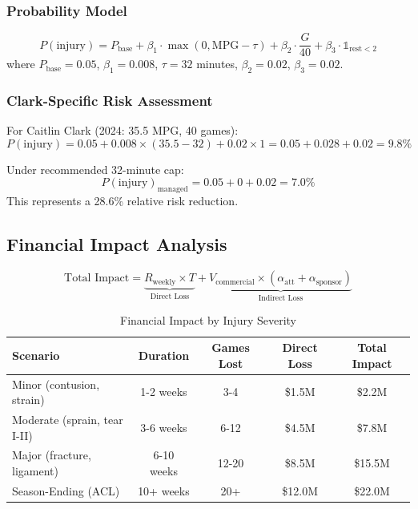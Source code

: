 \documentclass{mcmthesis}
\begin{document}
\subsubsection{Probability Model}

\begin{equation}
P(\text{injury}) = P_{\text{base}} + \beta_1 \cdot \max(0, \text{MPG} - \tau) + \beta_2 \cdot \frac{G}{40} + \beta_3 \cdot \mathbb{1}_{\text{rest} < 2}
\end{equation}
where $P_{\text{base}} = 0.05$, $\beta_1 = 0.008$, $\tau = 32$ minutes, $\beta_2 = 0.02$, $\beta_3 = 0.02$.

\subsubsection{Clark-Specific Risk Assessment}

For Caitlin Clark (2024: 35.5 MPG, 40 games):
\begin{equation}
P(\text{injury}) = 0.05 + 0.008 \times (35.5 - 32) + 0.02 \times 1 = 0.05 + 0.028 + 0.02 = 9.8\%
\end{equation}

Under recommended 32-minute cap:
\begin{equation}
P(\text{injury})_{\text{managed}} = 0.05 + 0 + 0.02 = 7.0\%
\end{equation}
This represents a 28.6\% relative risk reduction.

\subsection{Financial Impact Analysis}

\begin{equation}
\text{Total Impact} = \underbrace{R_{\text{weekly}} \times T}_{\text{Direct Loss}} + \underbrace{V_{\text{commercial}} \times (\alpha_{\text{att}} + \alpha_{\text{sponsor}})}_{\text{Indirect Loss}}
\end{equation}

\begin{table}[H]
\centering
\caption{Financial Impact by Injury Severity}
\begin{tabular}{lcccc}
\toprule
\textbf{Scenario} & \textbf{Duration} & \textbf{Games Lost} & \textbf{Direct Loss} & \textbf{Total Impact} \\
\midrule
Minor (contusion, strain) & 1-2 weeks & 3-4 & \$1.5M & \$2.2M \\
Moderate (sprain, tear I-II) & 3-6 weeks & 6-12 & \$4.5M & \$7.8M \\
Major (fracture, ligament) & 6-10 weeks & 12-20 & \$8.5M & \$15.5M \\
Season-Ending (ACL) & 10+ weeks & 20+ & \$12.0M & \$22.0M \\
\bottomrule
\end{tabular}
\end{table}
\end{document}
